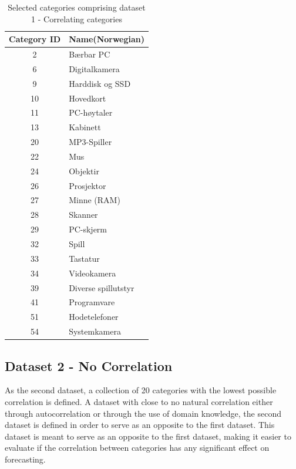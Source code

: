 \begin{table}[H]
  \centering
  \caption{Selected categories comprising dataset 1 - Correlating categories}
  \label{table:dataset1}
  \begin{tabular}{|c|l|}\hline
    Category ID & Name(Norwegian)     \\ \hline
    2           & Bærbar PC           \\ \hline
    6           & Digitalkamera       \\ \hline
    9           & Harddisk og SSD     \\ \hline
    10          & Hovedkort           \\ \hline
    11          & PC-høytaler         \\ \hline
    13          & Kabinett            \\ \hline
    20          & MP3-Spiller         \\ \hline
    22          & Mus                 \\ \hline
    24          & Objektir            \\ \hline
    26          & Prosjektor          \\ \hline
    27          & Minne (RAM)         \\ \hline
    28          & Skanner             \\ \hline
    29          & PC-skjerm           \\ \hline
    32          & Spill               \\ \hline
    33          & Tastatur            \\ \hline
    34          & Videokamera         \\ \hline
    39          & Diverse spillutstyr \\ \hline
    41          & Programvare         \\ \hline
    51          & Hodetelefoner       \\ \hline
    54          & Systemkamera        \\ \hline
  \end{tabular}
\end{table}



\subsection{Dataset 2 - No Correlation}

As the second dataset, a collection of 20 categories with the lowest possible correlation is defined.
A dataset with close to no natural correlation either through autocorrelation or through the use of domain knowledge, the second dataset is defined in order to serve as an opposite to the first dataset.
This dataset is meant to serve as an opposite to the first dataset, making it easier to evaluate if the correlation between categories has any significant effect on forecasting.

